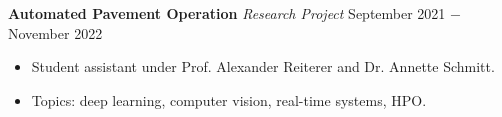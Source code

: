 \documentclass{article}
\begin{document}


\noindent \textbf{Automated Pavement Operation} \textit{Research Project} \hfill  September 2021 $-$ November 2022
\begin{itemize}[noitemsep,nolistsep,leftmargin=*]
    \item Student assistant under Prof. Alexander Reiterer and Dr. Annette Schmitt.
    \item Topics: deep learning, computer vision, real-time systems, HPO.\\
\end{itemize} 


\end{document}
